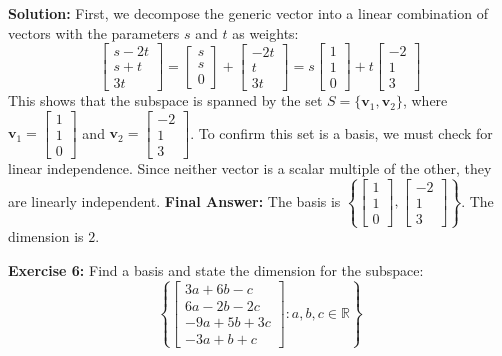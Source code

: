 \documentclass[12pt]{article}
\begin{document}
\textbf{Solution:}
First, we decompose the generic vector into a linear combination of vectors with the parameters $s$ and $t$ as weights:
\[ \begin{bmatrix} s - 2t \\ s + t \\ 3t \end{bmatrix} = \begin{bmatrix} s \\ s \\ 0 \end{bmatrix} + \begin{bmatrix} -2t \\ t \\ 3t \end{bmatrix} = s \begin{bmatrix} 1 \\ 1 \\ 0 \end{bmatrix} + t \begin{bmatrix} -2 \\ 1 \\ 3 \end{bmatrix} \]
This shows that the subspace is spanned by the set $S = \{ \mathbf{v}_1, \mathbf{v}_2 \}$, where $\mathbf{v}_1 = \begin{bmatrix} 1 \\ 1 \\ 0 \end{bmatrix}$ and $\mathbf{v}_2 = \begin{bmatrix} -2 \\ 1 \\ 3 \end{bmatrix}$.
To confirm this set is a basis, we must check for linear independence. Since neither vector is a scalar multiple of the other, they are linearly independent.
\textbf{Final Answer:} 
The basis is $\left\{ \begin{bmatrix} 1 \\ 1 \\ 0 \end{bmatrix}, \begin{bmatrix} -2 \\ 1 \\ 3 \end{bmatrix} \right\}$. The dimension is $2$.

\vspace{0.5cm}
\textbf{Exercise 6:} Find a basis and state the dimension for the subspace:
\[ \left\{ \begin{bmatrix} 3a + 6b - c \\ 6a - 2b - 2c \\ -9a + 5b + 3c \\ -3a + b + c \end{bmatrix} : a, b, c \in \mathbb{R} \right\} \]
\end{document}
